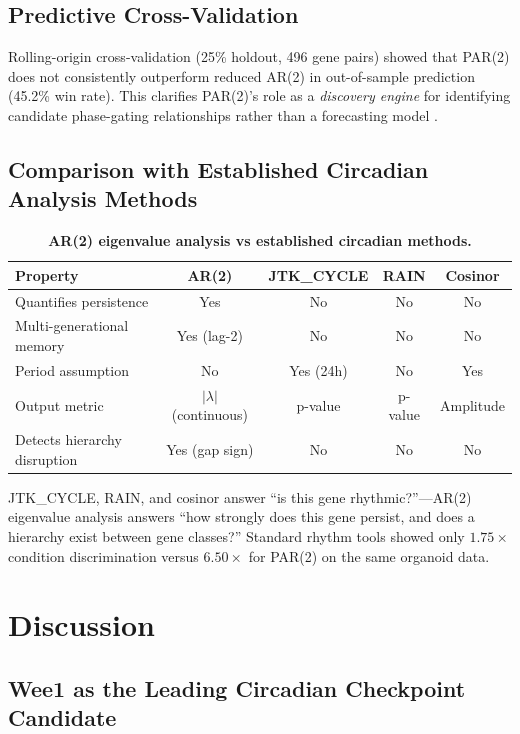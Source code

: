 \documentclass[11pt,letterpaper]{article}
\begin{document}
\subsection{Predictive Cross-Validation}

Rolling-origin cross-validation (25\% holdout, 496 gene pairs) showed that PAR(2) does not consistently outperform reduced AR(2) in out-of-sample prediction (45.2\% win rate). This clarifies PAR(2)'s role as a \textit{discovery engine} for identifying candidate phase-gating relationships rather than a forecasting model \citep{shmueli2010}.

\subsection{Comparison with Established Circadian Analysis Methods}

\begin{table}[H]
\centering
\caption{\textbf{AR(2) eigenvalue analysis vs established circadian methods.}}
\begin{tabular}{@{}lcccc@{}}
\toprule
\textbf{Property} & \textbf{AR(2)} & \textbf{JTK\_CYCLE} & \textbf{RAIN} & \textbf{Cosinor} \\
\midrule
Quantifies persistence & Yes & No & No & No \\
Multi-generational memory & Yes (lag-2) & No & No & No \\
Period assumption & No & Yes (24h) & No & Yes \\
Output metric & $|\lambda|$ (continuous) & p-value & p-value & Amplitude \\
Detects hierarchy disruption & Yes (gap sign) & No & No & No \\
\bottomrule
\end{tabular}
\end{table}

JTK\_CYCLE, RAIN, and cosinor answer ``is this gene rhythmic?''---AR(2) eigenvalue analysis answers ``how strongly does this gene persist, and does a hierarchy exist between gene classes?'' Standard rhythm tools showed only $1.75\times$ condition discrimination versus $6.50\times$ for PAR(2) on the same organoid data.

\section{Discussion}

\subsection{Wee1 as the Leading Circadian Checkpoint Candidate}
\end{document}
